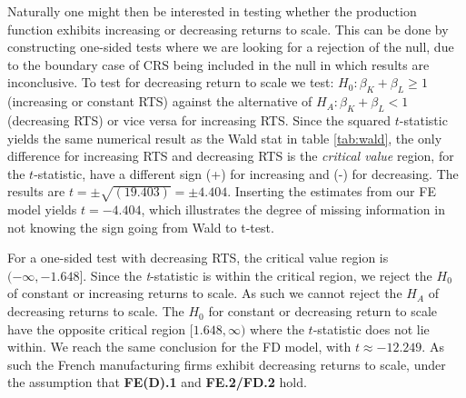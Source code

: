 
Naturally one might then be interested in testing whether the production function exhibits increasing or decreasing returns to scale. This can be done by constructing one-sided tests where we are looking for a rejection of the null, due to the boundary case of CRS being included in the null in which results are inconclusive. To test for decreasing return to scale we test: $H_0:\beta_K + \beta_L \geq 1$ (increasing or constant RTS) against the alternative of $H_A:\beta_K + \beta_L < 1$ (decreasing RTS) or vice versa for increasing RTS. Since the squared $t$-statistic yields the same numerical result as the Wald stat in table \ref{tab:wald}, the only difference for increasing RTS and decreasing RTS is the \textit{critical value} region, for the $t$-statistic, have a different sign (+) for increasing and (-) for decreasing. The results are $t=\pm \sqrt{(19.403)}=\pm4.404$. Inserting the estimates from our FE model yields $t=-4.404$, which illustrates the degree of missing information in not knowing the sign going from Wald to t-test. 


For a one-sided test with decreasing RTS, the critical value region is $(-\infty,-1.648]$. Since the \textit{t}-statistic is within the critical region, we reject the $H_0$ of constant or increasing returns to scale. As such we cannot reject the $H_A$ of decreasing returns to scale. The $H_0$ for constant or decreasing return to scale have the opposite critical region $[1.648,\infty)$ where the $t$-statistic does not lie within. We reach the same conclusion for the FD model, with $t\approx-12.249$. As such the French manufacturing firms exhibit decreasing returns to scale, under the assumption that \textbf{FE(D).1} and \textbf{FE.2/FD.2} hold.

% 
